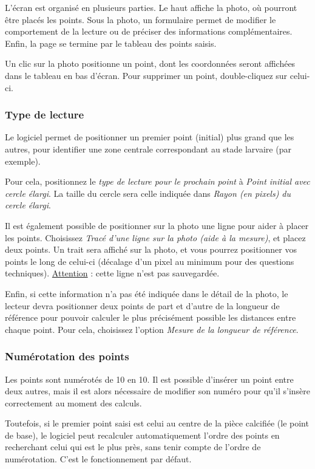 L'écran est organisé en plusieurs parties. Le haut affiche la photo, où pourront être placés les points. Sous la photo, un formulaire permet de modifier le comportement de la lecture ou de préciser des informations complémentaires. Enfin, la page se termine par le tableau des points saisis.

Un clic sur la photo positionne un point, dont les coordonnées seront affichées dans le tableau en bas d'écran. Pour supprimer un point, double-cliquez sur celui-ci.

\subsubsection{Type de lecture}

Le logiciel permet de positionner un premier point (initial) plus grand que les autres, pour identifier une zone centrale correspondant au stade larvaire (par exemple).

Pour cela, positionnez le \textit{type de lecture pour le prochain point} à \textit{Point initial avec cercle élargi}. La taille du cercle sera celle indiquée dans \textit{Rayon (en pixels) du cercle élargi}.

Il est également possible de positionner sur la photo une ligne pour aider à placer les points. Choisissez \textit{Tracé d'une ligne sur la photo (aide à la mesure)}, et placez deux points. Un trait sera affiché sur la photo, et vous pourrez positionner vos points le long de celui-ci (décalage d'un pixel au minimum pour des questions techniques). 
\underline{Attention} : cette ligne n'est pas sauvegardée.

Enfin, si cette information n'a pas été indiquée dans le détail de la photo, le lecteur devra positionner deux points de part et d'autre de la longueur de référence pour pouvoir calculer le plus précisément possible les distances entre chaque point. Pour cela, choisissez l'option \textit{Mesure de la longueur de référence}.

\subsubsection{Numérotation des points}

Les points sont numérotés de 10 en 10. Il est possible d'insérer un point entre deux autres, mais il est alors nécessaire de modifier son numéro pour qu'il s'insère correctement au moment des calculs.

Toutefois, si le premier point saisi est celui au centre de la pièce calcifiée (le point de base), le logiciel peut recalculer automatiquement l'ordre des points en recherchant celui qui est le plus près, sans tenir compte de l'ordre de numérotation. C'est le fonctionnement par défaut.

